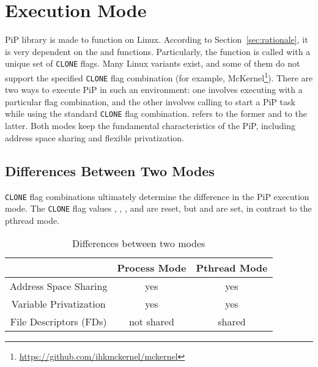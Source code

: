 
\section{Execution Mode}\label{sec:exec-mode}

PiP library is made to function on Linux. According to
Section~\ref{sec:rationale}, it is very dependent on the
 and  functions. Particularly, the
 function is called with a unique set of 
{\tt CLONE} flags. Many Linux variants exist, and some of them do not
support the specified {\tt CLONE} flag combination (for example,
McKernel\footnote{\url{https://github.com/ihkmckernel/mckernel}}). There
are two ways to execute PiP in such an environment: 
one involves executing  with a particular flag
combination, and the other involves calling 
to start a PiP task while 
using the standard {\tt CLONE} flag combination.  refers to the former and  to the
latter. Both modes keep the fundamental characteristics of the PiP,
including address space sharing and 
flexible privatization.

\subsection{Differences Between Two Modes}

{\tt CLONE} flag combinations ultimately determine the difference in the
PiP execution mode. The {\tt CLONE} flag values ,
, , and
 are reset, but  and
 are set, in contrast to the 
pthread mode. 

\begin{table}[ht]
  \centering
  \caption{Differences between two modes}\label{tbl:mode-diff}
  \vspace{3mm}
  \begin{tabular}{c||c|c}
    \hline
    & Process Mode & Pthread Mode \\
    \hline
    \hline
    Address Space Sharing & yes & yes \\
    Variable Privatization & yes & yes \\
    File Descriptors (FDs) & not shared & shared \\
    \hline
  \end{tabular}
\end{table}

